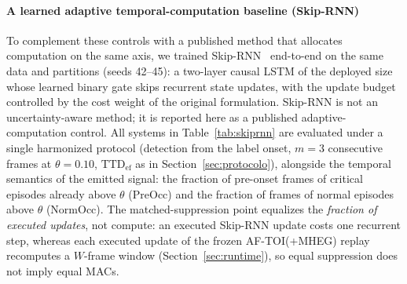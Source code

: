 \documentclass[a4paper,fleqn]{cas-dc}
\newcommand{\MHEG}{\mbox{MHEG}\xspace}
\begin{document}
{\paragraph{A learned adaptive temporal-computation baseline (Skip-RNN)}
To complement these controls with a published method that allocates
computation on the same axis, we trained Skip-RNN~\cite{campos2018skip}
end-to-end on the same data and partitions (seeds 42--45): a two-layer causal
LSTM of the deployed size whose learned binary gate skips recurrent state
updates, with the update budget controlled by the cost weight of the original
formulation. Skip-RNN is not an uncertainty-aware method; it is reported here
as a published adaptive-computation control. All systems in
Table~\ref{tab:skiprnn} are evaluated under a single harmonized protocol
(detection from the label onset, $m{=}3$ consecutive frames at
$\theta=0.10$, $\mathrm{TTD}_{\mathrm{ef}}$ as in
Section~\ref{sec:protocolo}), alongside the temporal semantics of the emitted
signal: the fraction of pre-onset frames of critical episodes already above
$\theta$ (PreOcc) and the fraction of frames of normal episodes above
$\theta$ (NormOcc). {\color{\revcolor}The matched-suppression point equalizes
the \emph{fraction of executed updates}, not compute: an executed Skip-RNN
update costs one recurrent step, whereas each executed update of the frozen
\mbox{AF-TOI}(+\MHEG) replay recomputes a $W$-frame window
(Section~\ref{sec:runtime}), so equal suppression does not imply equal
MACs.}

}
\end{document}
